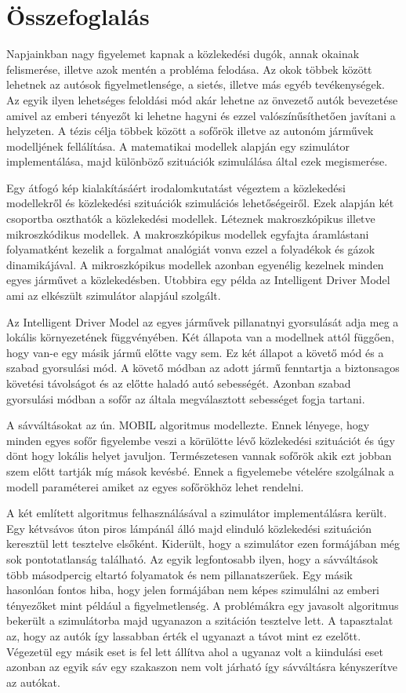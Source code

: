 \chapter*{Összefoglalás}
Napjainkban nagy figyelemet kapnak a közlekedési dugók, annak okainak felismerése, illetve azok mentén a probléma felodása. Az okok többek között lehetnek az autósok figyelmetlensége, a sietés, illetve más egyéb tevékenységek. Az egyik ilyen lehetséges feloldási mód akár lehetne az önvezető autók bevezetése amivel az emberi tényezőt ki lehetne hagyni és ezzel valószínűsíthetően javítani a helyzeten. A tézis célja többek között a sofőrök illetve az autonóm járművek modelljének fellálítása. A matematikai modellek alapján egy szimulátor implementálása, majd különböző szituációk szimulálása által ezek megismerése.

Egy átfogó kép kialakításáért irodalomkutatást végeztem a közlekedési modellekről és közlekedési szituációk szimulációs lehetőségeiről. Ezek alapján két csoportba oszthatók a közlekedési modellek. Léteznek makroszkópikus illetve mikroszkódikus modellek. A makroszkópikus modellek egyfajta áramlástani folyamatként kezelik a forgalmat analógiát vonva ezzel a folyadékok és gázok dinamikájával. A mikroszkópikus modellek azonban egyenélig kezelnek minden egyes járművet a közlekedésben. Utobbira egy példa az Intelligent Driver Model ami az elkészült szimulátor alapjául szolgált.

Az Intelligent Driver Model az egyes járművek pillanatnyi gyorsulását adja meg a lokális környezetének függvényében. Két állapota van a modellnek attól függően, hogy van-e egy másik jármű előtte vagy sem. Ez két állapot a követő mód és a szabad gyorsulási mód. A követő módban az adott jármű fenntartja a biztonsagos követési távolságot és az előtte haladó autó sebességét. Azonban szabad gyorsulási módban a sofőr az általa megválasztott sebességet fogja tartani.

A sávváltásokat az ún. MOBIL algoritmus modellezte. Ennek lényege, hogy minden egyes sofőr figyelembe veszi a körülötte lévő közlekedési szituációt és úgy dönt hogy lokális helyet javuljon. Természetesen vannak sofőrök akik ezt jobban szem előtt tartják míg mások kevésbé. Ennek a figyelemebe vételére szolgálnak a modell paraméterei amiket az egyes sofőrökhöz lehet rendelni.

A két említett algoritmus felhasználásával a szimulátor implementálásra került. Egy kétvsávos úton piros lámpánál álló majd elinduló közlekedési szituáción keresztül lett tesztelve elsőként. Kiderült, hogy a szimulátor ezen formájában még sok pontotatlanság található. Az egyik legfontosabb ilyen, hogy a sávváltások több másodpercig eltartó folyamatok és nem pillanatszerűek.  Egy másik hasonlóan fontos hiba, hogy jelen formájában nem képes szimulálni az emberi tényezőket mint például a figyelmetlenség. A problémákra egy javasolt algoritmus bekerült a szimulátorba majd ugyanazon a szitáción tesztelve lett. A tapasztalat az, hogy az autók így lassabban érték el ugyanazt a távot mint ez ezelőtt. Végezetül egy másik eset is fel lett állítva ahol a ugyanaz volt a kiindulási eset azonban az egyik sáv egy szakaszon nem volt járható így sávváltásra kényszerítve az autókat.

